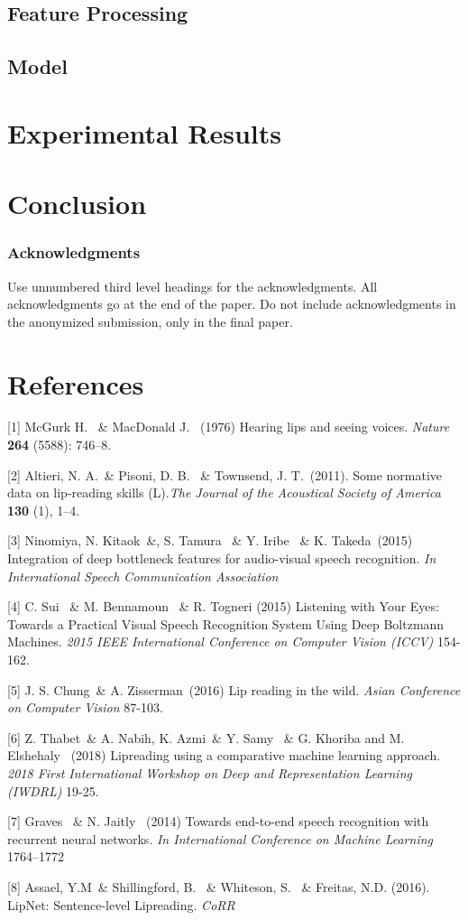 \documentclass{article}
\begin{document}
\subsection{Feature Processing}

\subsection{Model}

\section{Experimental Results}

\section{Conclusion}

\subsubsection*{Acknowledgments}

Use unnumbered third level headings for the acknowledgments. All acknowledgments
go at the end of the paper. Do not include acknowledgments in the anonymized
submission, only in the final paper.

\section*{References}
\small

[1] McGurk H. \ \& MacDonald J. \ (1976) Hearing lips and seeing voices. {\it Nature} {\bf 264} (5588): 746–8.

[2] Altieri, N. A.\ \& Pisoni, D. B. \ \& Townsend, J. T.\  (2011). Some normative data on lip-reading skills (L).{\it The Journal of the Acoustical Society of America}  {\bf 130} (1), 1–4.

[3]  Ninomiya, N. Kitaok\ \&, S. Tamura \ \& Y. Iribe \ \&  K. Takeda\ (2015) Integration of deep bottleneck features for audio-visual speech recognition. {\it In International Speech Communication Association}

[4] C. Sui \ \& M. Bennamoun \ \& R. Togneri (2015) Listening with Your Eyes: Towards a Practical Visual Speech Recognition System Using Deep Boltzmann Machines. {\it 2015 IEEE International Conference on Computer Vision (ICCV)} 154-162.

[5] J. S. Chung\ \& A. Zisserman\ (2016) Lip reading in the wild. {\it Asian Conference on Computer Vision} 87-103.

[6] Z. Thabet\ \& A. Nabih, K. Azmi\ \& Y. Samy \ \& G. Khoriba and M. Elshehaly \ (2018) Lipreading using a comparative machine learning approach. {\it 2018 First International Workshop on Deep and Representation Learning (IWDRL)} 19-25.

[7]  Graves \ \& N. Jaitly \ (2014) Towards end-to-end speech recognition with recurrent neural networks. {\it In International Conference on Machine Learning} 1764–1772

[8] Assael, Y.M\ \& Shillingford, B. \ \& Whiteson, S. \ \& Freitas, N.D. (2016). LipNet: Sentence-level Lipreading. {\it CoRR}
\end{document}
